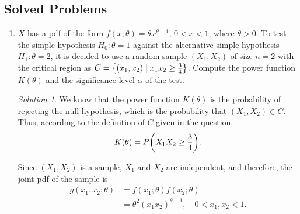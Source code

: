 \documentclass[svgnames, a5paper]{article}
\theoremstyle{definition}
\theoremstyle{remark}
\newtheorem*{Solution*}{Solution}
\begin{document}
\subsection{Solved Problems}\label{subsec:SolvedProblems1}
\begin{enumerate}
\item $X$ has a pdf of the form $f(x; \theta) = \theta x^{\theta - 1}$, $0 < x < 1$, where $\theta > 0$. To test the simple hypothesis $H_0 \colon \theta = 1$ against the alternative simple hypothesis $H_1 \colon \theta = 2$, it is decided to use a random sample $(X_1, X_2)$ of size $n = 2$ with the critical region as $C = \qty{ (x_1, x_2) \mid x_1 x_2 \ge \frac 3 4 }$. Compute the power function $K(\theta)$ and the significance level $\alpha$ of the test.
\begin{Solution*}
We know that the power function $K(\theta)$ is the probability of rejecting the null hypothesis, which is the probability that $(X_1, X_2) \in C$. Thus, according to the definition of $C$ given in the question,
\begin{align*}
K(\theta) = P\pqty{ X_1 X_2 \ge \frac 3 4 }.
\end{align*}

Since $(X_1, X_2)$ is a sample, $X_1$ and $X_2$ are independent, and therefore, the joint pdf of the sample is
\begin{align*}
g(x_1, x_2; \theta) &= f(x_1; \theta) f(x_2; \theta) \\
	&= \theta^2 (x_1 x_2)^{\theta - 1}, \quad 0 < x_1, x_2 < 1.
\end{align*}


\end{Solution*}
\end{enumerate}
\end{document}
